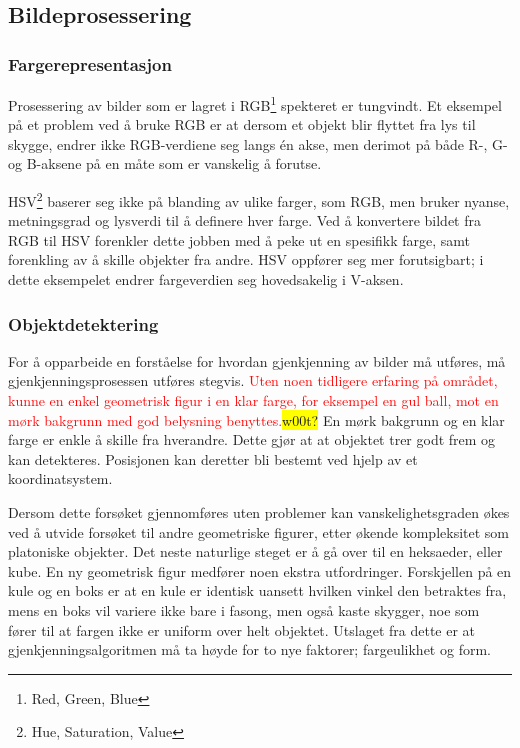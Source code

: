 \subsection{Bildeprosessering}

\subsubsection{Fargerepresentasjon}
Prosessering av bilder som er lagret i RGB\footnote{Red, Green, Blue} spekteret er tungvindt. Et eksempel på et problem ved å bruke RGB er at dersom et objekt blir flyttet fra lys til skygge, endrer ikke RGB-verdiene seg langs én akse, men derimot på både R-, G- og B-aksene på en måte som er vanskelig å forutse.

HSV\footnote{Hue, Saturation, Value} baserer seg ikke på blanding av ulike farger, som RGB, men bruker nyanse, metningsgrad og lysverdi til å definere hver farge. Ved å konvertere bildet fra RGB til HSV forenkler dette jobben med å peke ut en spesifikk farge, samt forenkling av å skille objekter fra andre. HSV oppfører seg mer forutsigbart; i dette eksempelet endrer fargeverdien seg hovedsakelig i V-aksen. 

\subsubsection{Objektdetektering}
For å opparbeide en forståelse for hvordan gjenkjenning av bilder må utføres, må gjenkjenningsprosessen utføres stegvis. \textcolor{red}{Uten noen tidligere erfaring på området, kunne en enkel geometrisk figur i en klar farge, for eksempel en gul ball, mot en mørk bakgrunn med god belysning benyttes.}\colorbox{yellow}{w00t?} En mørk bakgrunn og en klar farge er enkle å skille fra hverandre. Dette gjør at at objektet trer godt frem og kan detekteres. Posisjonen kan deretter bli bestemt ved hjelp av et koordinatsystem.

Dersom dette forsøket gjennomføres uten problemer kan vanskelighetsgraden økes ved å utvide forsøket til andre geometriske figurer, etter økende kompleksitet som platoniske objekter. Det neste naturlige steget er å gå over til en heksaeder, eller kube. En ny geometrisk figur medfører noen ekstra utfordringer. Forskjellen på en kule og en boks er at en kule er identisk uansett hvilken vinkel den betraktes fra, mens en boks vil variere ikke bare i fasong, men også kaste skygger, noe som fører til at fargen ikke er uniform over helt objektet. Utslaget fra dette er at gjenkjenningsalgoritmen må ta høyde for to nye faktorer; fargeulikhet og form. 

